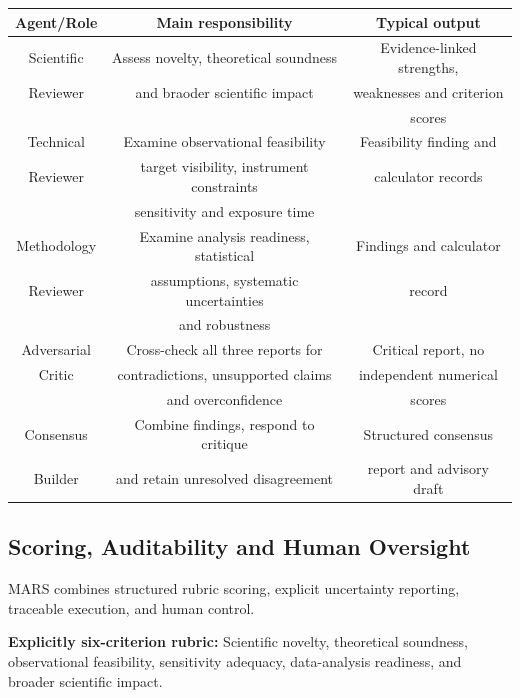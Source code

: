 \documentclass[11pt,twoside]{article}
\begin{document}
\begin{center}
  \begin{tabular}[t]{| c | c | c |}
    \hline
    \textbf{Agent/Role} & \textbf{Main responsibility} & \textbf{Typical output} \\
    \hline \hline
    Scientific & Assess novelty, theoretical soundness & Evidence-linked strengths, \\
    Reviewer & and braoder scientific impact & weaknesses and criterion \\
    & & scores \\
    \hline
    Technical & Examine observational feasibility & Feasibility finding and \\
    Reviewer & target visibility, instrument constraints & calculator records \\
    & sensitivity and exposure time & \\
    \hline
    Methodology & Examine analysis readiness, statistical & Findings and calculator \\
    Reviewer & assumptions, systematic uncertainties & record \\
    & and robustness & \\
    \hline
    Adversarial & Cross-check all three reports for & Critical report, no \\
    Critic & contradictions, unsupported claims & independent numerical \\
    & and overconfidence & scores \\
    \hline
    Consensus & Combine findings, respond to critique & Structured consensus \\
    Builder & and retain unresolved disagreement & report and advisory draft \\
    \hline
  \end{tabular}
\end{center}

\subsection{Scoring, Auditability and Human Oversight}

MARS combines structured rubric scoring, explicit uncertainty reporting, traceable execution, and human control.

\noindent \textbf{Explicitly six-criterion rubric:} Scientific novelty, theoretical soundness, observational feasibility, sensitivity adequacy, data-analysis readiness, and broader scientific impact.
\end{document}
